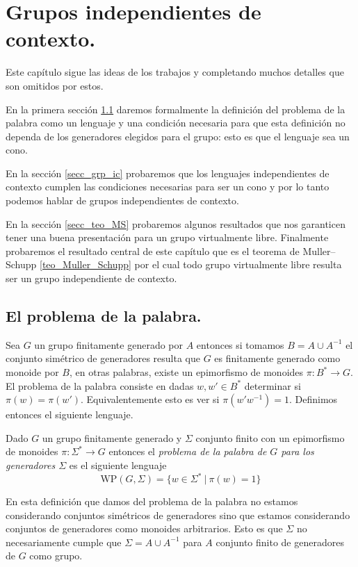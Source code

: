 \documentclass[tesis.tex]{subfiles}
\begin{document}
\chapter{Grupos independientes de contexto.}
Este capítulo sigue las ideas de los trabajos \cite{muller1983groups} y \cite{muller1985theory} completando muchos detalles que son omitidos por estos.

En la primera sección \ref{secc_wp} daremos formalmente la definición del problema de la palabra como un lenguaje y una condición necesaria para que esta definición no dependa de los generadores elegidos para el grupo: esto es que el lenguaje sea un cono.

En la sección \ref{secc_grp_ic} probaremos que los lenguajes independientes de contexto cumplen las condiciones necesarias para ser un cono y por lo tanto podemos hablar de grupos independientes de contexto.

En la sección \ref{secc_teo_MS} probaremos algunos resultados que nos garanticen tener una buena presentación para un grupo virtualmente libre.
Finalmente probaremos el resultado central de este capítulo que es el teorema de Muller--Schupp \ref{teo_Muller_Schupp} por el cual todo grupo virtualmente libre resulta ser un grupo independiente de contexto.


\section{El problema de la palabra.}\label{secc_wp}


Sea $G$ un grupo finitamente generado por $A$ entonces si tomamos $B = A \cup A^{-1}$ el conjunto simétrico de generadores resulta que $G$ es finitamente generado como monoide por $B$, en otras palabras, existe un epimorfismo de monoides $\pi:B^* \to G$.
El problema de la palabra consiste en dadas $w,w' \in B^*$ determinar si $\pi(w) {=} \pi(w')$.
Equivalentemente esto es ver si $\pi(w'w^{-1}) = 1$.
Definimos entonces el siguiente lenguaje.

\begin{deff}
	Dado $G$ un grupo finitamente generado 
	y $\Sigma$ conjunto finito con un epimorfismo de monoides $\pi:\Sigma^* \to G$ entonces
	el \emph{problema de la palabra de $G$ para los generadores $\Sigma$} es el siguiente lenguaje	
	\[ 
	\text{WP} (G, \Sigma) = \{ w \in \Sigma^* \ | \ \pi(w)= 1 \}
	\]
\end{deff}

\begin{obs}
	En esta definición que damos del problema de la palabra no estamos considerando conjuntos simétricos de generadores sino que estamos considerando conjuntos de generadores como monoides arbitrarios.
	Esto es que $\Sigma$ no necesariamente cumple que $\Sigma = A \cup A^{-1}$ para $A$ conjunto finito de generadores de $G$ como grupo.
\end{obs}
\end{document}
